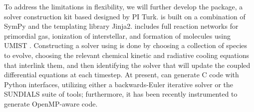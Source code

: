 


To address the limitations in  flexibility, we will
further develop the \dengo{} package, a solver construction kit based
designed by PI Turk. \dengo{} is built on a combination of SymPy and
the templating library Jinja2. \dengo{} includes full reaction
networks for primordial gas, ionization of 
interstellar, and formation of molecules using UMIST
\citep{2013A&A...550A..36M}.  Constructing a solver using \dengo{} is done by
choosing a collection of species to evolve, choosing the relevant chemical
kinetic and radiative cooling equations that interlink them, and then
identifying the solver that will update the coupled differential equations at
each timestep. At present, \dengo{} can generate C code with Python
interfaces, utilizing either a backwards-Euler iterative solver or the SUNDIALS
suite of tools; furthermore, it has been recently instrumented to generate
OpenMP-aware code.

